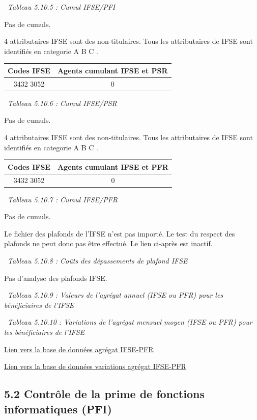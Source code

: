 ~\emph{Tableau 5.10.5 : Cumul IFSE/PFI}

Pas de cumuls.

4 attributaires IFSE sont des non-titulaires. Tous les attributaires de
IFSE sont identifiés en categorie A B C .

\begin{longtable}[]{@{}cc@{}}
\toprule
Codes IFSE & Agents cumulant IFSE et PSR\tabularnewline
\midrule
\endhead
3432 3052 & 0\tabularnewline
\bottomrule
\end{longtable}

~\emph{Tableau 5.10.6 : Cumul IFSE/PSR}

Pas de cumuls.

4 attributaires IFSE sont des non-titulaires. Tous les attributaires de
IFSE sont identifiés en categorie A B C .

\begin{longtable}[]{@{}cc@{}}
\toprule
Codes IFSE & Agents cumulant IFSE et PFR\tabularnewline
\midrule
\endhead
3432 3052 & 0\tabularnewline
\bottomrule
\end{longtable}

~\emph{Tableau 5.10.7 : Cumul IFSE/PFR}

Pas de cumuls.

Le fichier des plafonds de l'IFSE n'est pas importé. Le test du respect
des plafonds ne peut donc pas être effectué. Le lien ci-après est
inactif.

~\emph{Tableau 5.10.8 : Coûts des dépassements de plafond IFSE}

Pas d'analyse des plafonds IFSE.

~\emph{Tableau 5.10.9 : Valeurs de l'agrégat annuel (IFSE ou PFR) pour
les bénéficiaires de l'IFSE}

~\emph{Tableau 5.10.10 : Variations de l'agrégat mensuel moyen (IFSE ou
PFR) pour les bénéficiaires de l'IFSE}

\href{../Bases/Remunerations/beneficiaires.IFSE.PFR.csv}{Lien vers la base
de données agrégat IFSE-PFR}

\href{../Bases/Remunerations/beneficiaires.IFSE.PFR.Variation.csv}{Lien
vers la base de données variations agrégat IFSE-PFR}

\hypertarget{controle-de-la-prime-de-fonctions-informatiques-pfi}{%
\subsection{5.2 Contrôle de la prime de fonctions informatiques
(PFI)}\label{controle-de-la-prime-de-fonctions-informatiques-pfi}}

